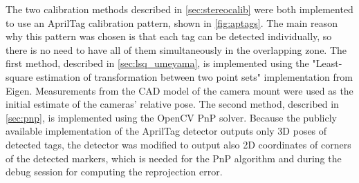 
The two calibration methods described in \autoref{sec:stereocalib} were both implemented to use an AprilTag calibration pattern, shown in \autoref{fig:aptags}.
The main reason why this pattern was chosen is that each tag can be detected individually, so there is no need to have all of them simultaneously in the overlapping zone.
The first method, described in \autoref{sec:lsq_umeyama}, is implemented using the "Least-square estimation of transformation between two point sets" \cite{Umeyama1991} implementation from Eigen.
Measurements from the CAD model of the camera mount were used as the initial estimate of the cameras' relative pose.
The second method, described in \autoref{sec:pnp}, is implemented using the OpenCV PnP solver.
Because the publicly available implementation of the AprilTag detector outputs only 3D poses of detected tags, the detector was modified to output also 2D coordinates of corners of the detected markers, which is needed for the PnP algorithm and during the debug session for computing the reprojection error.

